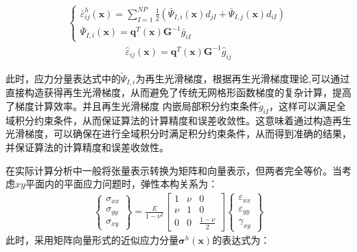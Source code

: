 \begin{equation}
\begin{split}
\begin{cases}\label{case2}
    \bar{\varepsilon}^h_{ij}(\pmb{x})=\displaystyle\sum_{I=1}^{N\!P}\frac{1}{2}(\bar{\Psi}_{I,i}(\pmb{x})d_{jI}+\bar{\Psi}_{I,j}(\pmb{x})d_{iI})\\
    \bar{\Psi}_{I,i}(\pmb{x})=\pmb{q}^T(\pmb{x})\pmb{G}^{-1}\bar{g}_{iI}
\end{cases}
\end{split}
\end{equation}
\begin{equation}
\begin{split}\label{case3}
    \hat{\varepsilon}_{ij}(\pmb{x})=\pmb{q}^T(\pmb{x})\pmb{G}^{-1}\hat{g}_{ij}
\end{split}
\end{equation}\par
此时，应力分量表达式中的$\tilde{\Psi}_{I,i}$为再生光滑梯度，根据再生光滑梯度理论\cite{},可以通过直接构造获得再生光滑梯度，从而避免了传统无网格形函数梯度的复杂计算，提高了梯度计算效率。并且再生光滑梯度
内嵌局部积分约束条件$\tilde{g}_{iI}$，这样可以满足全域积分约束条件，从而保证算法的计算精度和误差收敛性。这意味着通过构造再生光滑梯度，可以确保在进行全域积分时满足积分约束条件，从而得到准确的结果，并保证算法的计算精度和误差收敛性。\par
在实际计算分析中一般将张量表示转换为矩阵和向量表示，但两者完全等价。当考虑$xy$平面内的平面应力问题时，弹性本构关系为：
\begin{equation}
\begin{split}
    \left\{\begin{matrix}
    \sigma_{xx}\\\sigma_{yy}\\\sigma_{xy}
    \end{matrix}\right\}=\frac{E}{1-\nu^2}
    \left[\begin{matrix}
    1&\nu&0\\\nu&1&0\\0&0&\frac{1-\nu}{2}
    \end{matrix}\right]
    \left\{\begin{matrix}
    \varepsilon_{xx}\\\varepsilon_{yy}\\\gamma_{xy}
 \end{matrix}\right\}
\end{split}
\end{equation}
此时，采用矩阵向量形式的近似应力分量$\pmb{\sigma}^h(\pmb{x})$的表达式为：
